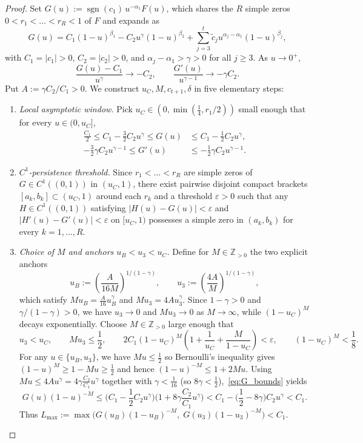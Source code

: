 \documentclass[11pt,a4paper]{amsart}
\theoremstyle{remark}
\newcommand{\Z}{\mathbb{Z}}
\begin{document}
\begin{proof}
Set $G(u) := \operatorname{sgn}(c_1)\, u^{-\alpha_1} F(u)$, which shares the $R$ simple zeros $0 < r_1 < \dots < r_R < 1$ of $F$ and expands as
\[
  G(u) = C_1 (1-u)^{\beta_1} - C_2 u^{\gamma}(1-u)^{\beta_2} + \sum_{j=3}^t \tilde{c}_j u^{\alpha_j - \alpha_1}(1-u)^{\beta_j},
\]
with $C_1 = |c_1| > 0$, $C_2 = |c_2| > 0$, and $\alpha_j - \alpha_1 > \gamma > 0$ for all $j \ge 3$. As $u \to 0^+$,
\[
  \frac{G(u) - C_1}{u^\gamma} \longrightarrow -C_2, \qquad
  \frac{G'(u)}{u^{\gamma - 1}} \longrightarrow -\gamma C_2.
\]
Put $A := \gamma C_2 / C_1 > 0$. We construct $u_C, M, c_{t+1}, \delta$ in five elementary steps:

\begin{enumerate}
  \item \emph{Local asymptotic window.} Pick $u_C \in (0, \min(\tfrac{1}{4}, r_1/2))$ small enough that for every $u \in (0, u_C]$,
  \begin{align}
    \frac{C_1}{2} \le C_1 - \frac{3}{2} C_2 u^\gamma \le G(u) &\le C_1 - \frac{1}{2} C_2 u^\gamma, \label{eq:G_bounds} \\
    -\frac{3}{2}\gamma C_2 u^{\gamma - 1} \le G'(u) &\le -\frac{1}{2}\gamma C_2 u^{\gamma - 1}. \label{eq:Gp_bounds}
  \end{align}

  \item \emph{$C^1$-persistence threshold.} Since $r_1 < \dots < r_R$ are simple zeros of $G \in C^1((0,1))$ in $(u_C, 1)$, there exist pairwise disjoint compact brackets $[a_k, b_k] \subset (u_C, 1)$ around each $r_k$ and a threshold $\varepsilon > 0$ such that any $H \in C^1((0, 1))$ satisfying $|H(u) - G(u)| < \varepsilon$ and $|H'(u) - G'(u)| < \varepsilon$ on $[u_C, 1)$ possesses a simple zero in $(a_k, b_k)$ for every $k = 1, \dots, R$.

  \item \emph{Choice of $M$ and anchors $u_B < u_3 < u_C$.} Define for $M \in \Z_{>0}$ the two explicit anchors
  \[
    u_B := \left(\frac{A}{16 M}\right)^{\!1/(1-\gamma)}, \qquad
    u_3 := \left(\frac{4 A}{M}\right)^{\!1/(1-\gamma)},
  \]
  which satisfy $M u_B = \frac{A}{16} u_B^\gamma$ and $M u_3 = 4 A u_3^\gamma$. Since $1 - \gamma > 0$ and $\gamma/(1-\gamma) > 0$, we have $u_3 \to 0$ and $M u_3 \to 0$ as $M \to \infty$, while $(1 - u_C)^M$ decays exponentially. Choose $M \in \Z_{>0}$ large enough that
  \[
    u_3 < u_C, \qquad M u_3 \le \frac{1}{2}, \qquad
    2 C_1 (1 - u_C)^M \left(1 + \frac{1}{u_C} + \frac{M}{1 - u_C}\right) < \varepsilon, \qquad
    (1 - u_C)^M < \frac{1}{8}.
  \]
  For any $u \in \{u_B, u_3\}$, we have $M u \le \frac{1}{2}$ so Bernoulli's inequality gives $(1 - u)^M \ge 1 - M u \ge \frac{1}{2}$ and hence $(1 - u)^{-M} \le 1 + 2 M u$. Using $M u \le 4 A u^\gamma = 4\gamma \frac{C_2}{C_1} u^\gamma$ together with $\gamma < \frac{1}{16}$ (so $8\gamma < \frac{1}{2}$),~\eqref{eq:G_bounds} yields
  \[
    G(u)(1 - u)^{-M} \le \Big(C_1 - \frac{1}{2} C_2 u^\gamma\Big)\Big(1 + 8\gamma \frac{C_2}{C_1} u^\gamma\Big)
    < C_1 - \Big(\frac{1}{2} - 8\gamma\Big) C_2 u^\gamma < C_1.
  \]
  Thus $L_{\max} := \max\!\big(G(u_B)(1-u_B)^{-M},\; G(u_3)(1-u_3)^{-M}\big) < C_1$.


\end{enumerate}
\end{proof}
\end{document}
